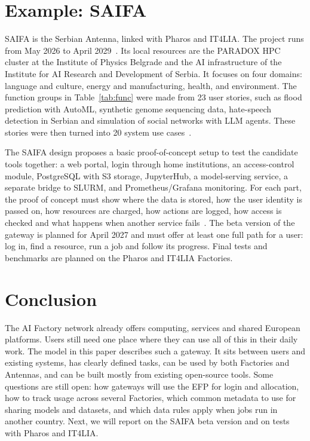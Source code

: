 \documentclass[conference,a4paper]{IEEEtran}
\begin{document}
\section{Example: SAIFA}
\label{sec:saifa}

SAIFA is the Serbian Antenna, linked with Pharos and IT4LIA. The project runs from May 2026 to April 2029~\cite{cordis_saifa}. Its local resources are the PARADOX HPC cluster at the Institute of Physics Belgrade and the AI infrastructure of the Institute for AI Research and Development of Serbia. It focuses on four domains: language and culture, energy and manufacturing, health, and environment. The function groups in Table~\ref{tab:func} were made from 23 user stories, such as flood prediction with AutoML, synthetic genome sequencing data, hate-speech detection in Serbian and simulation of social networks with LLM agents. These stories were then turned into 20 system use cases~\cite{saifa_d31}.

The SAIFA design proposes a basic proof-of-concept setup to test the candidate tools together: a web portal, login through home institutions, an access-control module, PostgreSQL with S3 storage, JupyterHub, a model-serving service, a separate bridge to SLURM, and Prometheus/Grafana monitoring. For each part, the proof of concept must show where the data is stored, how the user identity is passed on, how resources are charged, how actions are logged, how access is checked and what happens when another service fails~\cite{saifa_d31}. The beta version of the gateway is planned for April 2027 and must offer at least one full path for a user: log in, find a resource, run a job and follow its progress. Final tests and benchmarks are planned on the Pharos and IT4LIA Factories.

\section{Conclusion}

The AI Factory network already offers computing, services and shared European platforms. Users still need one place where they can use all of this in their daily work. The model in this paper describes such a gateway. It sits between users and existing systems, has clearly defined tasks, can be used by both Factories and Antennas, and can be built mostly from existing open-source tools. Some questions are still open: how gateways will use the EFP for login and allocation, how to track usage across several Factories, which common metadata to use for sharing models and datasets, and which data rules apply when jobs run in another country. Next, we will report on the SAIFA beta version and on tests with Pharos and IT4LIA.



\end{document}
